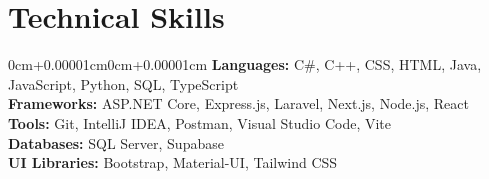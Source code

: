 \documentclass[10pt, letterpaper]{article}
\newenvironment{onecolentry}{\begin{adjustwidth}{0cm+0.00001cm}{0cm+0.00001cm}}{\end{adjustwidth}}
\begin{document}
\section{Technical Skills}
\begin{onecolentry}
    \textbf{Languages:} C\#, C++, CSS, HTML, Java, JavaScript, Python, SQL, TypeScript \\
    \vspace{0.05cm}
    \textbf{Frameworks:} ASP.NET Core, Express.js, Laravel, Next.js, Node.js, React \\
    \vspace{0.05cm}
    \textbf{Tools:} Git, IntelliJ IDEA, Postman, Visual Studio Code, Vite \\
    \vspace{0.05cm}
    \textbf{Databases:} SQL Server, Supabase \\
    \vspace{0.05cm}
    \textbf{UI Libraries:} Bootstrap, Material-UI, Tailwind CSS \\
    \vspace{0.05cm}

\end{onecolentry}
\end{document}
